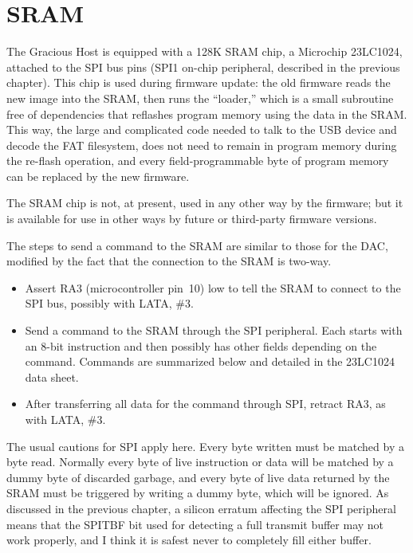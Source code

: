 \section{SRAM}

The Gracious Host is equipped with a 128K SRAM chip, a Microchip 23LC1024,
attached to the SPI bus pins (SPI1 on-chip peripheral, described in the
previous chapter).  This chip is used during firmware update: the old
firmware reads the new image into the SRAM, then runs the ``loader,'' which
is a small subroutine free of dependencies that reflashes program memory
using the data in the SRAM.  This way, the large and complicated code needed
to talk to the USB device and decode the FAT filesystem, does not need to
remain in program memory during the re-flash operation, and every
field-programmable byte of program memory can be replaced by the new
firmware.

The SRAM chip is not, at present, used in any other way by the firmware; but
it is available for use in other ways by future or third-party firmware
versions.

The steps to send a command to the SRAM are similar to those for the DAC,
modified by the fact that the connection to the SRAM is two-way.
\begin{itemize}
  \item Assert RA3 (microcontroller pin~10) low to tell the SRAM to connect
    to the SPI bus, possibly with  LATA, \#3.
  \item Send a command to the SRAM through the SPI peripheral.  Each starts
    with an 8-bit instruction and then possibly has other fields depending
    on the command.  Commands are summarized below and detailed in the
    23LC1024 data sheet.
  \item After transferring all data for the command through SPI,
    retract RA3, as with  LATA, \#3.
\end{itemize}

The usual cautions for SPI apply here.  Every byte written must be matched
by a byte read.  Normally every byte of live instruction or data will be
matched by a dummy byte of discarded garbage, and every byte of live data
returned by the SRAM must be triggered by writing a dummy byte, which will
be ignored.  As discussed in the previous chapter, a silicon erratum
affecting the SPI peripheral means that the SPITBF bit used for detecting a
full transmit buffer may not work properly, and I think it is safest never
to completely fill either buffer.

